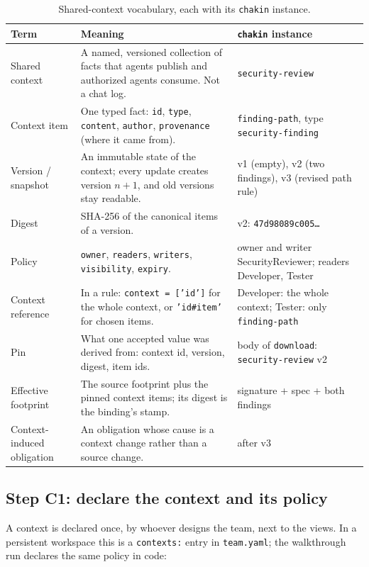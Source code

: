 \documentclass[10pt,a4paper]{article}
\newcommand{\code}[1]{\texttt{#1}}
\newcommand{\file}[1]{\texttt{#1}}
\theoremstyle{definition}
\begin{document}
\begin{table}[h]
\centering\small
\caption{Shared-context vocabulary, each with its \texttt{chakin} instance.}
\label{tab:context-glossary}
\begin{tabularx}{\textwidth}{@{}l >{\raggedright\arraybackslash}X >{\raggedright\arraybackslash}X@{}}
\toprule
Term & Meaning & \texttt{chakin} instance \\
\midrule
Shared context & A named, versioned collection of facts that agents publish and authorized agents consume. Not a chat log. & \code{security-review} \\
Context item & One typed fact: \code{id}, \code{type}, \code{content}, \code{author}, \code{provenance} (where it came from). & \code{finding-path}, type \code{security-finding} \\
Version / snapshot & An immutable state of the context; every update creates version $n{+}1$, and old versions stay readable. & v1 (empty), v2 (two findings), v3 (revised path rule) \\
Digest & SHA-256 of the canonical items of a version. & v2: \code{47d98089c005\ldots} \\
Policy & \code{owner}, \code{readers}, \code{writers}, \code{visibility}, \code{expiry}. & owner and writer SecurityReviewer; readers Developer, Tester \\
Context reference & In a rule: \code{context = ['id']} for the whole context, or \code{'id\#item'} for chosen items. & Developer: the whole context; Tester: only \code{finding-path} \\
Pin & What one accepted value was derived from: context id, version, digest, item ids. & body of \code{download}: \code{security-review} v2 \\
Effective footprint & The source footprint plus the pinned context items; its digest is the binding's stamp. & signature + spec + both findings \\
Context-induced obligation & An obligation whose cause is a context change rather than a source change. & 18 after v3 \\
\bottomrule
\end{tabularx}
\end{table}

\subsection{Step C1: declare the context and its policy}

A context is declared once, by whoever designs the team, next to the views.
In a persistent workspace this is a \code{contexts:} entry in
\file{team.yaml}; the walkthrough run declares the same policy in code:
\end{document}
